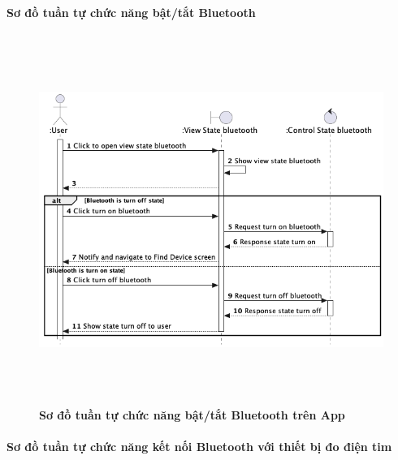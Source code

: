 \paragraph{Sơ đồ tuần tự chức năng bật/tắt Bluetooth}
\mbox{}

  \begin{figure}[H]
        \centering
        \includegraphics[width=16cm,height=12cm]{Images/mobile_app/turn_on_off_bluetooth.png}
        \caption[Sơ đồ tuần tự chức năng bật/tắt Bluetooth trên App]{\bfseries \fontsize{12pt}{0pt}
        \selectfont Sơ đồ tuần tự chức năng bật/tắt Bluetooth trên App}
        \label{hinh21} %
  \end{figure}


\paragraph{Sơ đồ tuần tự chức năng kết nối Bluetooth với thiết bị đo điện tim}
\mbox{}

